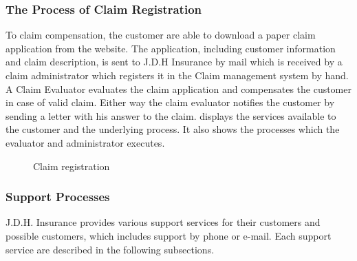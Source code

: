 \subsubsection{The Process of Claim Registration}
\label{sec:claim}
To claim compensation, the customer are able to download a paper claim application from the website. The application, including customer information and claim description, is sent to J.D.H Insurance by mail which is received by a claim administrator which registers it in the Claim management system by hand. A Claim Evaluator evaluates the claim application and compensates the customer in case of valid claim. Either way the claim evaluator notifies the customer by sending a letter with his answer to the claim.  displays the services available to the customer and the underlying process. It also shows the processes which the evaluator and administrator executes.
\begin{center}
	\begin{figure}[H]
		\centering
		\setlength\fboxsep{7pt}
		\setlength\fboxrule{0.5pt}
		\caption{Claim registration}
		\label{fig:map_claim}
	\end{figure}
\end{center}
%
\subsubsection{Support Processes}
\label{sec:support_processes}
J.D.H. Insurance provides various support services for their customers and possible customers, which includes support by phone or e-mail. Each support service are described in the following subsections.
